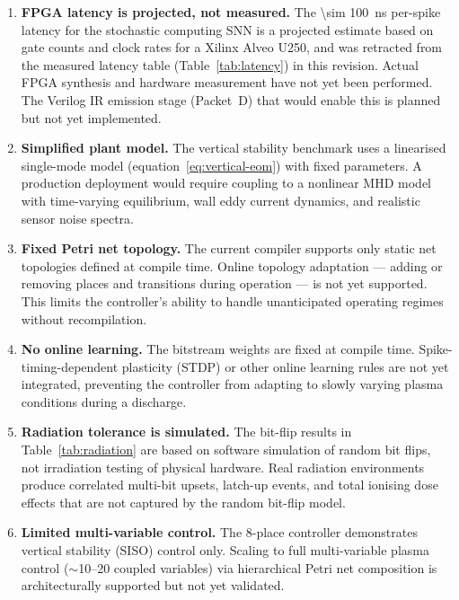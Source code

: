 \documentclass[12pt]{article}
\begin{document}
\begin{enumerate}
  \item \textbf{FPGA latency is projected, not measured.}  The
    \SI{\sim 100}{\nano\second} per-spike latency for the stochastic
    computing SNN is a projected estimate based on gate counts and clock
    rates for a Xilinx Alveo U250, and was retracted from the measured
    latency table (Table~\ref{tab:latency}) in this revision.
    Actual FPGA synthesis and hardware measurement have not yet been
    performed.  The Verilog IR emission stage (Packet~D) that would
    enable this is planned but not yet implemented.

  \item \textbf{Simplified plant model.}  The vertical stability
    benchmark uses a linearised single-mode model
    (equation~\ref{eq:vertical-eom}) with fixed parameters.  A
    production deployment would require coupling to a nonlinear MHD
    model with time-varying equilibrium, wall eddy current dynamics,
    and realistic sensor noise spectra.

  \item \textbf{Fixed Petri net topology.}  The current compiler
    supports only static net topologies defined at compile time.
    Online topology adaptation --- adding or removing places and
    transitions during operation --- is not yet supported.  This
    limits the controller's ability to handle unanticipated operating
    regimes without recompilation.

  \item \textbf{No online learning.}  The bitstream weights are
    fixed at compile time.  Spike-timing-dependent plasticity (STDP)
    or other online learning rules are not yet integrated, preventing
    the controller from adapting to slowly varying plasma conditions
    during a discharge.

  \item \textbf{Radiation tolerance is simulated.}  The bit-flip
    results in Table~\ref{tab:radiation} are based on software
    simulation of random bit flips, not irradiation testing of
    physical hardware.  Real radiation environments produce correlated
    multi-bit upsets, latch-up events, and total ionising dose
    effects that are not captured by the random bit-flip model.

  \item \textbf{Limited multi-variable control.}  The 8-place
    controller demonstrates vertical stability (SISO) control only.
    Scaling to full multi-variable plasma control ($\sim$10--20 coupled
    variables) via hierarchical Petri net composition is architecturally
    supported but not yet validated.
\end{enumerate}
\end{document}
